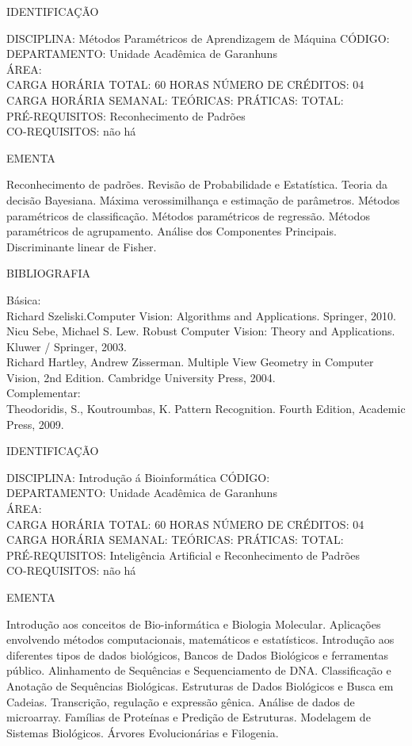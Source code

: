 \documentclass[
	12pt,				%
	openright,			%
  oneside,     %
	a4paper,			%
	chapter=TITLE,		%
	english,			%
	french,				%
	spanish,			%
	brazil				%
	]{abntex2}
\begin{document}
\begin{apendicesenv}
\newpage IDENTIFICAÇÃO

DISCIPLINA: Métodos Paramétricos de Aprendizagem de Máquina CÓDIGO:\\ 
DEPARTAMENTO: Unidade Acadêmica de Garanhuns\\
ÁREA: \\
CARGA HORÁRIA TOTAL: 60 HORAS NÚMERO DE CRÉDITOS: 04\\
CARGA HORÁRIA SEMANAL: TEÓRICAS: PRÁTICAS: TOTAL: \\
PRÉ-REQUISITOS: Reconhecimento de Padrões\\
CO-REQUISITOS: não há

EMENTA 

Reconhecimento de padrões. Revisão de Probabilidade e Estatística. Teoria da decisão Bayesiana. Máxima verossimilhança e estimação de parâmetros. Métodos paramétricos de classificação. Métodos paramétricos de regressão. Métodos paramétricos de agrupamento. Análise dos Componentes Principais. Discriminante linear de Fisher.

BIBLIOGRAFIA 

Básica:\\
Richard Szeliski.Computer Vision: Algorithms and Applications. Springer,
2010.\\
Nicu Sebe, Michael S. Lew. Robust Computer Vision: Theory and
Applications. Kluwer / Springer, 2003.\\
Richard Hartley, Andrew Zisserman. Multiple View Geometry in Computer
Vision, 2nd Edition. Cambridge University Press, 2004.\\
Complementar:\\
Theodoridis, S., Koutroumbas, K. Pattern Recognition. Fourth Edition,
Academic Press, 2009.

\newpage IDENTIFICAÇÃO

DISCIPLINA: Introdução á Bioinformática CÓDIGO:\\ 
DEPARTAMENTO: Unidade Acadêmica de Garanhuns\\
ÁREA: \\
CARGA HORÁRIA TOTAL: 60 HORAS NÚMERO DE CRÉDITOS: 04\\
CARGA HORÁRIA SEMANAL: TEÓRICAS: PRÁTICAS: TOTAL: \\
PRÉ-REQUISITOS: Inteligência Artificial e Reconhecimento de Padrões\\
CO-REQUISITOS: não há

EMENTA 

Introdução aos conceitos de Bio-informática e Biologia Molecular.
Aplicações envolvendo métodos computacionais, matemáticos e
estatísticos. Introdução aos diferentes tipos de dados biológicos,
Bancos de Dados Biológicos e ferramentas público. Alinhamento de
Sequências e Sequenciamento de DNA. Classificação e Anotação de
Sequências Biológicas. Estruturas de Dados Biológicos e Busca em
Cadeias. Transcrição, regulação e expressão gênica. Análise de dados de
microarray. Famílias de Proteínas e Predição de Estruturas. Modelagem
de Sistemas Biológicos. Árvores Evolucionárias e Filogenia.


\end{apendicesenv}
\end{document}
